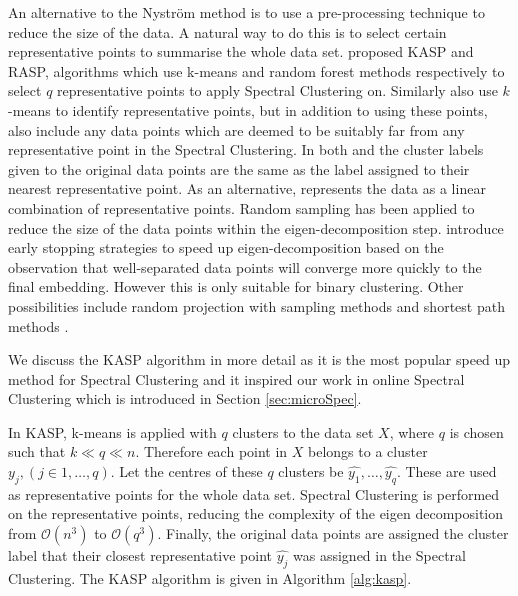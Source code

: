 
An alternative to the Nystr\"{o}m method is to use a pre-processing technique to reduce the size of the data. A natural way to do this is to select certain representative points to summarise the whole data set.  \cite{Yan2009} proposed KASP and RASP, algorithms which use k-means and random forest methods respectively to select $q$ representative points to apply Spectral Clustering on.  Similarly \cite{Shinnou2008} also use $k$-means to identify representative points, but in addition to using these points, \cite{Shinnou2008} also include any data points which are deemed to be suitably far from any representative point in the Spectral Clustering.  In both \cite{Yan2009} and \cite{Shinnou2008} the cluster labels given to the original data points are the same as the label assigned to their nearest representative point. As an alternative, \cite{Chen2011} represents the data as a linear combination of representative points. Random sampling has been applied to reduce the size of the data points within the eigen-decomposition step. \cite{Chen2006a, Liu2007} introduce early stopping strategies to speed up eigen-decomposition based on the observation that well-separated data points will converge more quickly to the final embedding. However this is only suitable for binary clustering.  Other possibilities include random projection with sampling methods \citep{Sakai2009} and shortest path methods \citep{Liu2013b}.


We discuss the KASP algorithm in more detail as it is the most popular speed up method for Spectral Clustering and it inspired our work in online Spectral Clustering which is introduced in Section \ref{sec:microSpec}.

In KASP, k-means is applied with $q$ clusters to the data set $X$, where $q$ is chosen such that $k \ll q \ll n$. Therefore each point in $X$ belongs to a cluster $y_j, (j \in 1, \hdots, q)$. Let the centres of these $q$ clusters be  $\widehat{y_1}, \hdots, \widehat{y_q}$. These  are used as representative points for the whole data set. Spectral Clustering is performed on the representative points, reducing the complexity of the eigen decomposition from $\mathcal{O}(n^3)$ to $\mathcal{O}(q^3)$. Finally, the original data points are assigned the cluster label  that their closest representative point $\widehat{y_j}$ was assigned in the Spectral Clustering. The KASP algorithm is given in Algorithm \ref{alg:kasp}.

